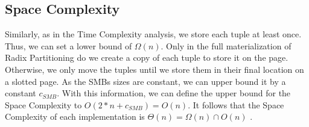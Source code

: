 \subsection{Space Complexity}
Similarly, as in the Time Complexity analysis, we store each tuple at least once.
Thus, we can set a lower bound of $\Omega(n)$.
Only in the full materialization of Radix Partitioning do we create a copy of each tuple to store it on the page.
Otherwise, we only move the tuples until we store them in their final location on a slotted page.
As the \acfp{SMB} sizes are constant, we can upper bound it by a constant $c_{SMB}$.
With this information, we can define the upper bound for the Space Complexity to $O(2 * n + c_{SMB}) = O(n)$.
It follows that the Space Complexity of each implementation is $\Theta(n) = \Omega(n) \cap O(n) $ .
